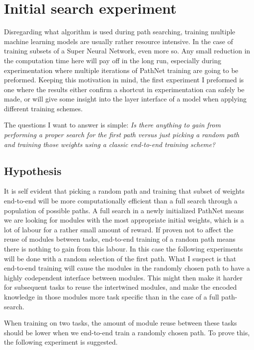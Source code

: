 \chapter{Initial search experiment}
Disregarding what algorithm is used during path searching, training multiple machine learning models are usually rather resource intensive. In the case of training subsets of a Super Neural Network, even more so. Any small reduction in the computation time here will pay off in the long run, especially during experimentation where multiple iterations of PathNet training are going to be preformed. Keeping this motivation in mind, the first experiment I preformed is one where the results either confirm a shortcut in experimentation can safely be made, or will give some insight into the layer interface of a model when applying different training schemes.

The questions I want to answer is simple: \textit{Is there anything to gain from performing a proper search for the first path versus just picking a random path and training those weights using a classic end-to-end training scheme?}

\section{Hypothesis}
It is self evident that picking a random path and training that subset of weights end-to-end will be more computationally efficient than a full search through a population of possible paths. A full search in a newly initialized PathNet means we are looking for modules with the most appropriate initial weights, which is a lot of labour for a rather small amount of reward. If proven not to affect the reuse of modules between tasks, end-to-end training of a random path means there is nothing to gain from this labour. In this case the following experiments will be done with a random selection of the first path. 
What I suspect is that end-to-end training will cause the modules in the randomly chosen path to have a highly codependent interface between modules. This might then make it harder for subsequent tasks to reuse the intertwined modules, and make the encoded knowledge in those modules more task specific than in the case of a full path-search. 

When training on two tasks, the amount of module reuse between these tasks should be lower when we end-to-end train a randomly chosen path. To prove this, the following experiment is suggested. 

